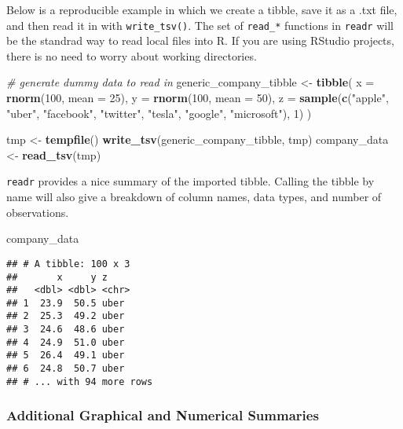 \documentclass[]{book}
\newenvironment{Shaded}{\begin{snugshade}}{\end{snugshade}}
\newcommand{\CommentTok}[1]{\textcolor[rgb]{0.56,0.35,0.01}{\textit{#1}}}
\newcommand{\DataTypeTok}[1]{\textcolor[rgb]{0.13,0.29,0.53}{#1}}
\newcommand{\DecValTok}[1]{\textcolor[rgb]{0.00,0.00,0.81}{#1}}
\newcommand{\KeywordTok}[1]{\textcolor[rgb]{0.13,0.29,0.53}{\textbf{#1}}}
\newcommand{\NormalTok}[1]{#1}
\newcommand{\StringTok}[1]{\textcolor[rgb]{0.31,0.60,0.02}{#1}}
\begin{document}
Below is a reproducible example in which we create a tibble, save it as a .txt file, and then read it in with \texttt{write\_tsv()}. The set of \texttt{read\_*} functions in \texttt{readr} will be the standrad way to read local files into R. If you are using RStudio projects, there is no need to worry about working directories.

\begin{Shaded}
\begin{Highlighting}[]
\CommentTok{# generate dummy data to read in}
\NormalTok{generic_company_tibble <-}\StringTok{ }\KeywordTok{tibble}\NormalTok{(}
  \DataTypeTok{x =} \KeywordTok{rnorm}\NormalTok{(}\DecValTok{100}\NormalTok{, }\DataTypeTok{mean =} \DecValTok{25}\NormalTok{),}
  \DataTypeTok{y =} \KeywordTok{rnorm}\NormalTok{(}\DecValTok{100}\NormalTok{, }\DataTypeTok{mean =} \DecValTok{50}\NormalTok{),}
  \DataTypeTok{z =} \KeywordTok{sample}\NormalTok{(}\KeywordTok{c}\NormalTok{(}\StringTok{"apple"}\NormalTok{, }\StringTok{"uber"}\NormalTok{, }\StringTok{"facebook"}\NormalTok{, }\StringTok{"twitter"}\NormalTok{, }\StringTok{"tesla"}\NormalTok{, }\StringTok{"google"}\NormalTok{, }\StringTok{"microsoft"}\NormalTok{), }\DecValTok{1}\NormalTok{)}
\NormalTok{)}

\NormalTok{tmp <-}\StringTok{ }\KeywordTok{tempfile}\NormalTok{()}
\KeywordTok{write_tsv}\NormalTok{(generic_company_tibble, tmp)}
\NormalTok{company_data <-}\StringTok{ }\KeywordTok{read_tsv}\NormalTok{(tmp)}
\end{Highlighting}
\end{Shaded}

\texttt{readr} provides a nice summary of the imported tibble. Calling the tibble by name will also give a breakdown of column names, data types, and number of observations.

\begin{Shaded}
\begin{Highlighting}[]
\NormalTok{company_data}
\end{Highlighting}
\end{Shaded}

\begin{verbatim}
## # A tibble: 100 x 3
##       x     y z    
##   <dbl> <dbl> <chr>
## 1  23.9  50.5 uber 
## 2  25.3  49.2 uber 
## 3  24.6  48.6 uber 
## 4  24.9  51.0 uber 
## 5  26.4  49.1 uber 
## 6  24.8  50.7 uber 
## # ... with 94 more rows
\end{verbatim}

\hypertarget{additional-graphical-and-numerical-summaries}{%
\subsubsection{Additional Graphical and Numerical Summaries}\label{additional-graphical-and-numerical-summaries}}
\end{document}
